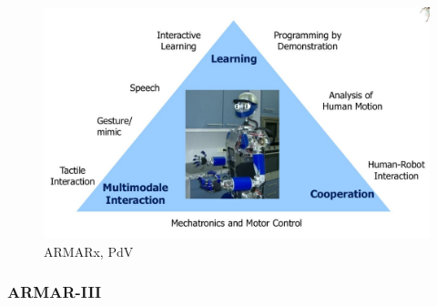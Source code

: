 \begin{figure}
	\centering
	\includegraphics[width=.6\textwidth]{figures/armar.png}
	\caption{ARMARx, PdV}
\end{figure}

\subsubsection{ARMAR-III} %

